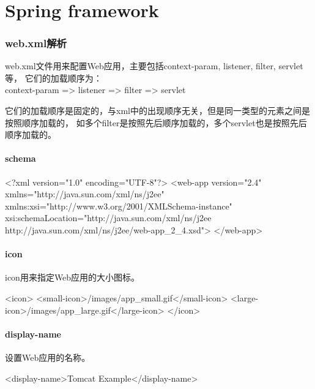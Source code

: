 \documentclass[a4paper,11pt]{article}
\begin{document}
\tt %
\pagestyle{header}
\sybmaketitle
\tableofcontents
\newpage

\pagestyle{main}
\setcounter{page}{1}

\part[Spring framework]{Spring framework}

\section[web.xml解析]{web.xml解析}
web.xml文件用来配置Web应用，主要包括context-param, listener, filter, servlet等，
它们的加载顺序为：\\
context-param => listener => filter => servlet

它们的加载顺序是固定的，与xml中的出现顺序无关，但是同一类型的元素之间是按照顺序加载的，
如多个filter是按照先后顺序加载的，多个servlet也是按照先后顺序加载的。


\subsection[schema]{schema}
\begin{xmlcode}
<?xml version="1.0" encoding="UTF-8"?>
<web-app version="2.4" 
    xmlns="http://java.sun.com/xml/ns/j2ee" 
    xmlns:xsi="http://www.w3.org/2001/XMLSchema-instance"
    xsi:schemaLocation="http://java.sun.com/xml/ns/j2ee 
        http://java.sun.com/xml/ns/j2ee/web-app_2_4.xsd">
</web-app>
\end{xmlcode}

\subsection[icon]{icon}
icon用来指定Web应用的大小图标。

\begin{xmlcode}
<icon>
    <small-icon>/images/app_small.gif</small-icon>
    <large-icon>/images/app_large.gif</large-icon>
</icon>
\end{xmlcode}

\subsection[display-name]{display-name}
设置Web应用的名称。

\begin{xmlcode}
<display-name>Tomcat Example</display-name>
\end{xmlcode}
\end{document}
